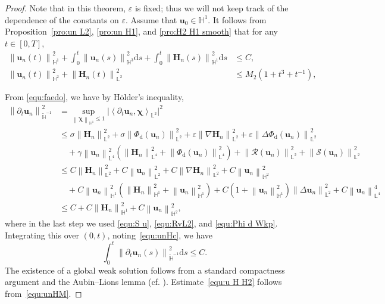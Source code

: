 \documentclass[11pt, reqno]{amsart}
\theoremstyle{definition}
\numberwithin{equation}{section}
\newcommand{\bff}{\boldsymbol}
\newcommand{\bb}{\mathbb}
\newcommand{\ds}{\mathrm{d}s}
\newcommand{\norm}[2]{\left\|{#1}\right\|_{#2}}
\newcommand{\inpro}[2]{\left\langle#1,#2\right\rangle}
\begin{document}
\begin{proof}
Note that in this theorem, $\varepsilon$ is fixed; thus we will not keep track of the dependence of the constants on $\varepsilon$.
Assume that $\bff{u}_0\in\bb{H}^1$. It follows from Proposition~\ref{pro:un L2}, \ref{pro:un H1}, and \ref{pro:H2 H1 smooth} that for any $t\in [0,T]$,
\begin{align}
\label{equ:unHc}
    \norm{\bff{u}_n(t)}{\bb{H}^1}^2
    +
    \int_0^t \norm{\bff{u}_n(s)}{\bb{H}^3}^2 \ds
    +
    \int_0^t \norm{\bff{H}_n(s)}{\bb{H}^1}^2 \ds
    &\leq C,
    \\
\label{equ:unHM}
    \norm{\bff{u}_n(t)}{\bb{H}^2}^2
    +
    \norm{\bff{H}_n(t)}{\bb{L}^2}^2
    &\leq
    M_2(1+t^3+t^{-1}),
\end{align}

From \eqref{equ:faedo}, we have by H\"older's inequality,
    \begin{align*}
        \norm{\partial_t \bff{u}_n}{\widetilde{\bb{H}}^{-1}}^2
        &= 
        \sup_{\norm{\bff{\chi}}{\bb{H}^1}\leq 1} \big| \inpro{\partial_t \bff{u}_n}{\bff{\chi}}_{\bb{L}^2} \big|^2
        \\
        &\leq 
        \sigma \norm{\bff{H}_n}{\bb{L}^2}^2
        +
        \sigma \norm{\Phi_{\mathrm{d}}(\bff{u}_n)}{\bb{L}^2}^2
        +
        \varepsilon \norm{\nabla\bff{H}_n}{\bb{L}^2}^2
        +
        \varepsilon \norm{\Delta\Phi_{\mathrm{d}}(\bff{u}_n)}{\bb{L}^2}^2
        \\
        &\quad
        +
        \gamma \norm{\bff{u}_n}{\bb{L}^4}^2 \left(\norm{\bff{H}_n}{\bb{L}^4}^2 + \norm{\Phi_{\mathrm{d}}(\bff{u}_n)}{\bb{L}^4}^2 \right)
        +
        \norm{\mathcal{R}(\bff{u}_n)}{\bb{L}^2}^2
        +
        \norm{\mathcal{S}(\bff{u}_n)}{\bb{L}^2}^2
        \\
        &\leq
        C \norm{\bff{H}_n}{\bb{L}^2}^2 + C \norm{\bff{u}_n}{\bb{L}^2}^2
        +
        C\norm{\nabla\bff{H}_n}{\bb{L}^2}^2
        +
        C\norm{\bff{u}_n}{\bb{H}^2}^2
        \\
        &\quad
        +
        C\norm{\bff{u}_n}{\bb{H}^1}^2 \left(\norm{\bff{H}_n}{\bb{H}^1}^2 + \norm{\bff{u}_n}{\bb{H}^1}^2 \right)
        +
        C \left(1+\norm{\bff{u}_n}{\bb{H}^1}^2 \right) \norm{\Delta \bff{u}_n}{\bb{L}^2}^2
        +
        C\norm{\bff{u}_n}{\bb{L}^4}^4
        \\
        &\leq
        C + C\norm{\bff{H}_n}{\bb{H}^1}^2 + C\norm{\bff{u}_n}{\bb{H}^2}^2,
    \end{align*}
    where in the last step we used \eqref{equ:S u}, \eqref{equ:RvL2}, and \eqref{equ:Phi d Wkp}. Integrating this over $(0,t)$, noting~\eqref{equ:unHc}, we have
    \[
    \int_0^t \norm{\partial_t \bff{u}_n(s)}{\widetilde{\bb{H}}^{-1}}^2 \ds \leq C.
    \]
The existence of a global weak solution follows from a standard compactness argument and the Aubin--Lions lemma (cf. \cite[Theorem~2.2]{SoeTra23}). Estimate~\eqref{equ:u H H2} follows from~\eqref{equ:unHM}.


\end{proof}
\end{document}
